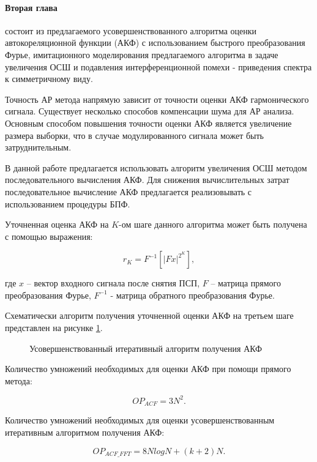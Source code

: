 \paragraph{Вторая глава} состоит из предлагаемого усовершенствованного алгоритма оценки автокореляционной функции (АКФ) с использованием
быстрого преобразования Фурье, имитационного моделирования предлагаемого алгоритма в задаче увеличения ОСШ и подавления 
интерференционной помехи - приведения спектра к симметричному виду.

Точность АР метода напрямую зависит от точности оценки АКФ гармонического сигнала.
Существует несколько способов компенсации шума для АР анализа.
Основным способом повышения точности оценки АКФ является увеличение размера выборки, что в случае модулированного сигнала может быть затруднительным. 

В данной работе предлагается использовать алгоритм увеличения ОСШ методом последовательного вычисления АКФ.
Для снижения вычислительных затрат последовательное вычисление АКФ предлагается реализовывать с использованием процедуры БПФ. 

Уточненная оценка АКФ на ${K}$-ом шаге данного алгоритма может быть получена с помощью выражения:
\begin{center}
\begin{equation}
	\label{eq:akf_3}
	\hat{r}_K = F^{-1}\left[ \left| Fx \right| ^{2^K} \right],
\end{equation}
\end{center}
где ${x}$ – вектор входного сигнала после снятия ПСП, ${F}$ – матрица прямого преобразования Фурье,
${F^{-1}}$ - матрица обратного преобразования Фурье.

Схематически алгоритм получения уточненной оценки АКФ на третьем шаге представлен на рисунке \ref{pic:akf_pic}.
\begin{figure}[h]
	\center{}
	\caption{Усовершенствованный итеративный алгоритм получения АКФ}
	\label{pic:akf_pic}
\end{figure}

Количество умножений необходимых для оценки АКФ при помощи прямого метода:
\begin{center}
\begin{equation}
	OP_{ACF} = 3N^2.
\end{equation}
\end{center}

Количество умножений необходимых для оценки усовершенствованным итеративным алгоритмом получения АКФ: \begin{center}
\begin{equation}
	OP_{ACF\_FFT} = 8NlogN + (k+2)N.
\end{equation}
\end{center}

